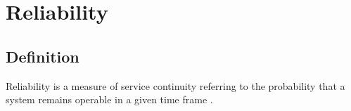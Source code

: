 \documentclass[a4paper,10pt]{article}
\begin{document}

 
 





\section{Reliability}
\subsection{Definition}
Reliability is a measure of service continuity referring to the probability that a system remains operable in a given time frame \cite{Rak15}. 
\end{document}
